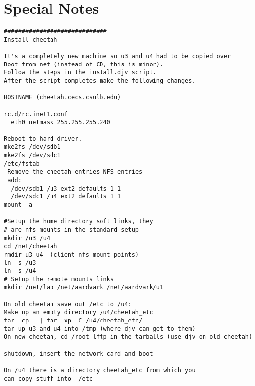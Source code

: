 \chapter{Special Notes}

\begin{verbatim}
#############################
Install cheetah

It's a completely new machine so u3 and u4 had to be copied over
Boot from net (instead of CD, this is minor).
Follow the steps in the install.djv script.
After the script completes make the following changes.

HOSTNAME (cheetah.cecs.csulb.edu)

rc.d/rc.inet1.conf
  eth0 netmask 255.255.255.240

Reboot to hard driver.
mke2fs /dev/sdb1
mke2fs /dev/sdc1
/etc/fstab
 Remove the cheetah entries NFS entries
 add:
  /dev/sdb1 /u3 ext2 defaults 1 1
  /dev/sdc1 /u4 ext2 defaults 1 1
mount -a

#Setup the home directory soft links, they
# are nfs mounts in the standard setup
mkdir /u3 /u4
cd /net/cheetah
rmdir u3 u4  (client nfs mount points)
ln -s /u3
ln -s /u4
# Setup the remote mounts links
mkdir /net/lab /net/aardvark /net/aardvark/u1

On old cheetah save out /etc to /u4:
Make up an empty directory /u4/cheetah_etc
tar -cp . | tar -xp -C /u4/cheetah_etc/
tar up u3 and u4 into /tmp (where djv can get to them)
On new cheetah, cd /root lftp in the tarballs (use djv on old cheetah)

shutdown, insert the network card and boot

On /u4 there is a directory cheetah_etc from which you
can copy stuff into  /etc


\end{verbatim}
